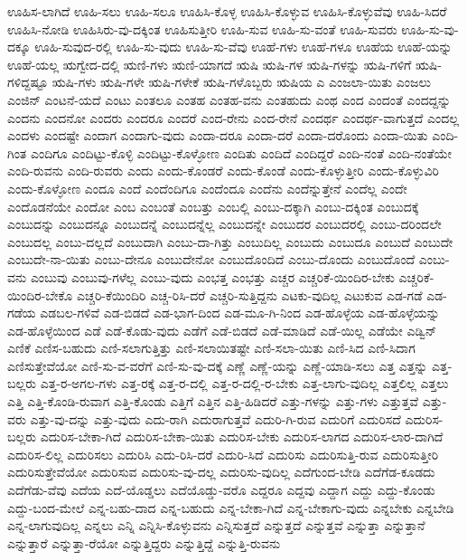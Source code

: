 {ಊಹಿಸ-ಲಾಗಿದೆ
ಊಹಿ-ಸಲು
ಊಹಿ-ಸಲೂ
ಊಹಿಸಿ-ಕೊಳ್ಳ
ಊಹಿಸಿ-ಕೊಳ್ಳುವ
ಊಹಿಸಿ-ಕೊಳ್ಳುವೆವು
ಊಹಿ-ಸಿದರೆ
ಊಹಿಸಿ-ನೋಡಿ
ಊಹಿಸಿರು-ವು-ದಕ್ಕಿಂತ
ಊಹಿಸುತ್ತೀರಿ
ಊಹಿ-ಸುವ
ಊಹಿ-ಸು-ವಂತೆ
ಊಹಿ-ಸುವರು
ಊಹಿ-ಸು-ವು-ದಕ್ಕೂ
ಊಹಿ-ಸುವುದ-ರಲ್ಲಿ
ಊಹಿ-ಸು-ವುದು
ಊಹಿ-ಸು-ವೆವು
ಊಹೆ-ಗಳು
ಊಹೆ-ಗಳೂ
ಊಹೆಯ
ಊಹೆ-ಯನ್ನು
ಊಹೆ-ಯಲ್ಲ
ಋಗ್ವೇದ-ದಲ್ಲಿ
ಋಣಿ-ಗಳು
ಋಣಿ-ಯಾಗದೆ
ಋಷಿ
ಋಷಿ-ಗಳ
ಋಷಿ-ಗಳನ್ನು
ಋಷಿ-ಗಳಿಗೆ
ಋಷಿ-ಗಳಿದ್ದಷ್ಟೂ
ಋಷಿ-ಗಳು
ಋಷಿ-ಗಳೇ
ಋಷಿ-ಗಳೇಕೆ
ಋಷಿ-ಗಳೊಬ್ಬರು
ಋಷಿಯ
ಎ
ಎಂಜಲಾ-ಯಿತು
ಎಂಜಲು
ಎಂಜಿನ್
ಎಂಟನೆ-ಯದೆ
ಎಂಟು
ಎಂತಲೂ
ಎಂತಹ
ಎಂತಹ-ವನು
ಎಂತಹುದು
ಎಂಥ
ಎಂದ
ಎಂದಂತೆ
ಎಂದದ್ದನ್ನು
ಎಂದನು
ಎಂದನೋ
ಎಂದರು
ಎಂದರೂ
ಎಂದರೆ
ಎಂದ-ರೇನು
ಎಂದ-ರೇನೆ
ಎಂದರ್ಥ
ಎಂದರ್ಥ-ವಾಗುತ್ತದೆ
ಎಂದಲ್ಲ
ಎಂದಳು
ಎಂದಷ್ಟೇ
ಎಂದಾಗ
ಎಂದಾಗು-ವುದು
ಎಂದಾ-ದರೂ
ಎಂದಾ-ದರೆ
ಎಂದಾ-ದರೊಂದು
ಎಂದಾ-ಯಿತು
ಎಂದಿ-ಗಿಂತ
ಎಂದಿಗೂ
ಎಂದಿಟ್ಟು-ಕೊಳ್ಳಿ
ಎಂದಿಟ್ಟು-ಕೊಳ್ಳೋಣ
ಎಂದಿತು
ಎಂದಿದೆ
ಎಂದಿದ್ದರೆ
ಎಂದಿ-ನಂತೆ
ಎಂದಿ-ನಂತೆಯೇ
ಎಂದಿ-ರುವನು
ಎಂದಿ-ರುವರು
ಎಂದು
ಎಂದು-ಕೊಂಡರೆ
ಎಂದು-ಕೊಂಡೆ
ಎಂದು-ಕೊಳ್ಳುತ್ತೀರಿ
ಎಂದು-ಕೊಳ್ಳುವಿರಿ
ಎಂದು-ಕೊಳ್ಳೋಣ
ಎಂದೂ
ಎಂದೆ
ಎಂದೆಂದಿಗೂ
ಎಂದೆಂದೂ
ಎಂದೆನು
ಎಂದೆನ್ನುತ್ತೇನೆ
ಎಂದೆಲ್ಲ
ಎಂದೇ
ಎಂದೊಡನೆಯೇ
ಎಂದೋ
ಎಂಬ
ಎಂಬಂತೆ
ಎಂಬತ್ತು
ಎಂಬಲ್ಲಿ
ಎಂಬು-ದಕ್ಕಾಗಿ
ಎಂಬು-ದಕ್ಕಿಂತ
ಎಂಬುದಕ್ಕೆ
ಎಂಬುದನ್ನು
ಎಂಬುದನ್ನೂ
ಎಂಬುದನ್ನೆ
ಎಂಬುದನ್ನೆಲ್ಲ
ಎಂಬುದನ್ನೇ
ಎಂಬುದರ
ಎಂಬುದರಲ್ಲಿ
ಎಂಬು-ದರಿಂದಲೇ
ಎಂಬುದಲ್ಲ
ಎಂಬು-ದಲ್ಲದೆ
ಎಂಬುದಾಗಿ
ಎಂಬು-ದಾ-ಗಿತ್ತು
ಎಂಬುದಿಲ್ಲ
ಎಂಬುದು
ಎಂಬುದೂ
ಎಂಬುದೆ
ಎಂಬುದೇ
ಎಂಬುದೇ-ನಾ-ಯಿತು
ಎಂಬು-ದೇನೂ
ಎಂಬುದೇನೋ
ಎಂಬುದೊಂದಿದೆ
ಎಂಬು-ದೊಂದು
ಎಂಬುದೊಂದೆ
ಎಂಬು-ವನು
ಎಂಬುವು
ಎಂಬುವು-ಗಳೆಲ್ಲ
ಎಂಬು-ವುದು
ಎಂಭತ್ತ
ಎಂಭತ್ತು
ಎಚ್ಚರ
ಎಚ್ಚರಿಕೆ-ಯಿಂದಿರ-ಬೇಕು
ಎಚ್ಚರಿಕೆ-ಯಿಂದಿರ-ಬೇಕೊ
ಎಚ್ಚರಿ-ಕೆಯಿಂದಿರಿ
ಎಚ್ಚ-ರಿಸಿ-ದರೆ
ಎಚ್ಚರಿ-ಸುತ್ತಿದ್ದನು
ಎಟಕು-ವುದಿಲ್ಲ
ಎಟುಕುವ
ಎಡ-ಗಡೆ
ಎಡ-ಗಡೆಯ
ಎಡಬಲ-ಗಳಿವೆ
ಎಡ-ಬಿಡದೆ
ಎಡ-ಭಾಗ-ದಿಂದ
ಎಡ-ಮೂ-ಗಿ-ನಿಂದ
ಎಡ-ಹೊಳ್ಳೆಯ
ಎಡ-ಹೊಳ್ಳೆಯನ್ನು
ಎಡ-ಹೊಳ್ಳೆಯಿಂದ
ಎಡೆ
ಎಡೆ-ಕೊಡು-ವುದು
ಎಡೆಗೆ
ಎಡೆ-ಬಿಡದೆ
ಎಡೆ-ಮಾಡಿದೆ
ಎಡೆ-ಯಿಲ್ಲ
ಎಡೆಯೇ
ಎಡ್ವಿನ್
ಎಣಿಕೆ
ಎಣಿಸ-ಬಹುದು
ಎಣಿ-ಸಲಾಗುತ್ತಿತ್ತು
ಎಣಿ-ಸಲಾಯಿತಷ್ಟೇ
ಎಣಿ-ಸಲಾ-ಯಿತು
ಎಣಿ-ಸಿದ
ಎಣಿ-ಸಿದಾಗ
ಎಣಿಸುತ್ತೇವೆಯೋ
ಎಣಿ-ಸು-ವ-ವರೆಗೆ
ಎಣಿ-ಸು-ವು-ದಕ್ಕೆ
ಎಣ್ಣೆ
ಎಣ್ಣೆ-ಯನ್ನು
ಎಣ್ಣೆ-ಯಾಡಿ-ಸಲು
ಎತ್ತ
ಎತ್ತನ್ನು
ಎತ್ತ-ಬಲ್ಲರು
ಎತ್ತ-ರ-ಅಗಲ-ಗಳು
ಎತ್ತ-ರಕ್ಕೆ
ಎತ್ತ-ರ-ದಲ್ಲಿ
ಎತ್ತ-ರ-ದಲ್ಲಿ-ರ-ಬೇಕು
ಎತ್ತ-ಲಾಗು-ವುದಿಲ್ಲ
ಎತ್ತಲಿಲ್ಲ
ಎತ್ತಲು
ಎತ್ತಿ
ಎತ್ತಿ-ಕೊಂಡಿ-ರುವಾಗ
ಎತ್ತಿ-ಕೊಂಡು
ಎತ್ತಿಗೆ
ಎತ್ತಿನ
ಎತ್ತಿ-ಹಿಡಿದರೆ
ಎತ್ತು-ಗಳನ್ನು
ಎತ್ತು-ಗಳು
ಎತ್ತುತ್ತವೆ
ಎತ್ತು-ವರು
ಎತ್ತು-ವು-ದನ್ನು
ಎತ್ತು-ವುದು
ಎದು-ರಾಗಿ
ಎದುರಾಗುತ್ತವೆ
ಎದುರಿ-ಗಿ-ರುವ
ಎದುರಿಗೆ
ಎದುರಿಸದೆ
ಎದುರಿಸ-ಬಲ್ಲರು
ಎದುರಿಸ-ಬೇಕಾ-ಗಿದೆ
ಎದುರಿಸ-ಬೇಕಾ-ಯಿತು
ಎದುರಿಸ-ಬೇಕು
ಎದುರಿಸ-ಲಾಗದ
ಎದುರಿಸ-ಲಾರ-ದಾಗಿದೆ
ಎದುರಿಸ-ಲಿಲ್ಲ
ಎದುರಿಸಲು
ಎದುರಿಸಿ
ಎದು-ರಿಸಿ-ದರೆ
ಎದುರಿ-ಸಿದೆ
ಎದುರಿಸು
ಎದುರಿಸುತ್ತಿ-ರುವ
ಎದುರಿಸುತ್ತೀರಿ
ಎದುರಿಸುತ್ತೇವೆಯೋ
ಎದುರಿಸುವ
ಎದುರಿಸು-ವು-ದಲ್ಲ
ಎದುರಿಸು-ವುದಿಲ್ಲ
ಎದೆಗುಂದ-ಬೇಡಿ
ಎದೆಗೆಡ-ಕೂಡದು
ಎದೆಗೆಡು-ವೆವು
ಎದೆಯ
ಎದೆ-ಯೊಡ್ಡಲು
ಎದೆಯೊಡ್ಡು-ವರೊ
ಎದ್ದರೂ
ಎದ್ದವು
ಎದ್ದಾಗ
ಎದ್ದು
ಎದ್ದು-ಕೊಂಡು
ಎದ್ದು-ಬಂದ-ಮೇಲೆ
ಎನ್ನ-ಬಹು-ದಾದ
ಎನ್ನ-ಬಹುದು
ಎನ್ನ-ಬೇಕಾ-ಗಿದೆ
ಎನ್ನ-ಬೇಕಾಗು-ವುದು
ಎನ್ನಬೇಕು
ಎನ್ನಬೇಡಿ
ಎನ್ನ-ಲಾಗುವುದಿಲ್ಲ
ಎನ್ನಲು
ಎನ್ನಿ
ಎನ್ನಿಸಿ-ಕೊಳ್ಳುವನು
ಎನ್ನಿಸುತ್ತದೆ
ಎನ್ನುತ್ತದೆ
ಎನ್ನುತ್ತವೆ
ಎನ್ನುತ್ತಾ
ಎನ್ನುತ್ತಾನೆ
ಎನ್ನುತ್ತಾರೆ
ಎನ್ನುತ್ತಾ-ರೆಯೋ
ಎನ್ನುತ್ತಿದ್ದರು
ಎನ್ನುತ್ತಿದ್ದೆ
ಎನ್ನುತ್ತಿ-ರುವನು
}
